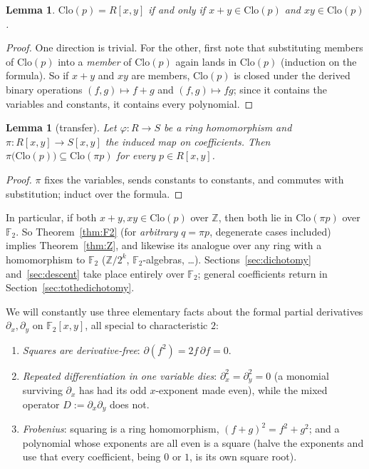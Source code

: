 \documentclass[11pt]{article}
\newtheorem{lemma}[theorem]{Lemma}
\theoremstyle{definition}
\theoremstyle{remark}
\newcommand{\F}{\mathbb{F}}
\newcommand{\Z}{\mathbb{Z}}
\newcommand{\Clo}{\mathrm{Clo}}
\begin{document}
\begin{lemma}\label{lem:criterion}
$\Clo(p) = R[x,y]$ if and only if $x + y \in \Clo(p)$ and
$xy \in \Clo(p)$.
\end{lemma}

\begin{proof}
One direction is trivial.  For the other, first note that substituting
members of $\Clo(p)$ into a \emph{member} of $\Clo(p)$ again lands in
$\Clo(p)$ (induction on the formula).  So if $x+y$ and $xy$ are
members, $\Clo(p)$ is closed under the derived binary operations
$(f,g) \mapsto f + g$ and $(f,g) \mapsto fg$; since it contains the
variables and constants, it contains every polynomial.
\end{proof}

\begin{lemma}[transfer]\label{lem:transfer}
Let $\varphi : R \to S$ be a ring homomorphism and
$\pi : R[x,y] \to S[x,y]$ the induced map on coefficients.  Then
$\pi\bigl(\Clo(p)\bigr) \subseteq \Clo(\pi p)$ for every
$p \in R[x,y]$.
\end{lemma}

\begin{proof}
$\pi$ fixes the variables, sends constants to constants, and commutes
with substitution; induct over the formula.
\end{proof}

In particular, if both $x+y, xy \in \Clo(p)$ over $\Z$, then both lie
in $\Clo(\pi p)$ over $\F_2$.  So Theorem~\ref{thm:F2} (for
\emph{arbitrary} $q = \pi p$, degenerate cases included) implies
Theorem~\ref{thm:Z}, and likewise its analogue over any ring with a
homomorphism to $\F_2$ ($\Z/2^k$, $\F_2$-algebras, \dots).
Sections~\ref{sec:dichotomy} and~\ref{sec:descent} take place
entirely over $\F_2$; general coefficients return in
Section~\ref{sec:tothedichotomy}.

\medskip

We will constantly use three elementary facts about the formal partial
derivatives $\partial_x, \partial_y$ on $\F_2[x,y]$, all special to
characteristic $2$:

\begin{enumerate}
  \item \emph{Squares are derivative-free}:
        $\partial(f^2) = 2f\,\partial f = 0$.
  \item \emph{Repeated differentiation in one variable dies}:
        $\partial_x^2 = \partial_y^2 = 0$ (a monomial surviving
        $\partial_x$ has had its odd $x$-exponent made even), while the
        mixed operator $D := \partial_x\partial_y$ does not.
  \item \emph{Frobenius}: squaring is a ring homomorphism,
        $(f+g)^2 = f^2 + g^2$; and a polynomial whose exponents are
        all even is a square (halve the exponents and use that every
        coefficient, being $0$ or $1$, is its own square root).
\end{enumerate}
\end{document}
